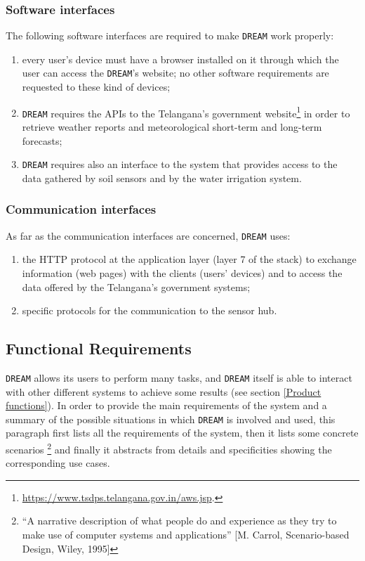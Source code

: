 \documentclass{article}
\begin{document}
\subsubsection{Software interfaces}
The following software interfaces are required to make \verb|DREAM| work properly:
\begin{enumerate}
\item every user’s device must have a browser installed on it through which the user can access the \verb|DREAM|’s website; no other software requirements are requested to these kind of devices;
\item \verb|DREAM| requires the APIs to the Telangana’s government website\footnote{\url{https://www.tsdps.telangana.gov.in/aws.jsp}.} in order to retrieve weather reports and meteorological short-term and long-term forecasts;
\item \verb|DREAM| requires also an interface to the system that provides access to the data gathered by soil sensors and by the water irrigation system.
\end{enumerate}
\subsubsection{Communication interfaces}
As far as the communication interfaces are concerned, \verb|DREAM| uses:
\begin{enumerate}
    \item the HTTP protocol at the application layer (layer 7 of the stack) to exchange information (web pages) with the clients (users’ devices) and to access the data offered by the Telangana’s government systems;
    \item specific protocols for the communication to the sensor hub.
\end{enumerate}

\subsection{Functional Requirements}
\verb |DREAM| allows its users to perform many tasks, and \verb |DREAM| itself is able to interact with other different systems to achieve some results (see section \ref{Product functions}). In order to provide the main requirements of the system and a summary of the possible situations in which \verb |DREAM| is involved and used, this paragraph first lists all the requirements of the system, then it lists some concrete scenarios \footnote{“A narrative description of what people do and experience as
they try to make use of computer systems and applications” [M.
Carrol, Scenario-based Design, Wiley, 1995]} and finally it abstracts from details and specificities showing the corresponding use cases.
\end{document}
